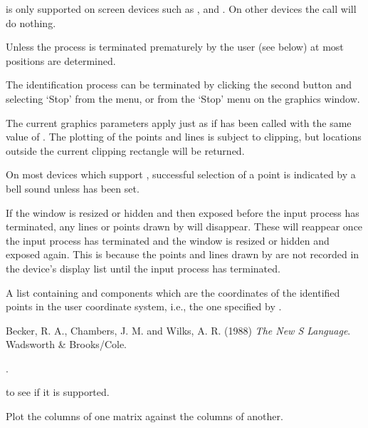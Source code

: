 \begin{Details}\relax
{} is only supported on screen devices such as
,  and .  On other devices the
call will do nothing.

Unless the process is terminated prematurely by the user (see below)
at most  positions are determined.

The identification process can be terminated by clicking the second
button and selecting `Stop' from the menu, or from the
`Stop' menu on the graphics window.

The current graphics parameters apply just as if 
has been called with the same value of . The plotting of
the points and lines is subject to clipping, but locations outside the
current clipping rectangle will be returned.

On most devices which support , successful selection of
a point is indicated by a bell sound unless
 has been set.

If the window is resized or hidden and then exposed before the input
process has terminated, any lines or points drawn by 
will disappear.  These will reappear once the input process has
terminated and the window is resized or hidden and exposed again.
This is because the points and lines drawn by  are not
recorded in the device's display list until the input process has
terminated.
\end{Details}
%
\begin{Value}
A list containing  and  components which are the
coordinates of the identified points in the user coordinate system,
i.e., the one specified by .
\end{Value}
%
\begin{References}\relax
Becker, R. A., Chambers, J. M. and Wilks, A. R. (1988)
\emph{The New S Language}.
Wadsworth \& Brooks/Cole.
\end{References}
%
\begin{SeeAlso}\relax
{}.

 to see if it is supported.
\end{SeeAlso}
%
\begin{Description}\relax
Plot the columns of one matrix against the columns of another.
\end{Description}

